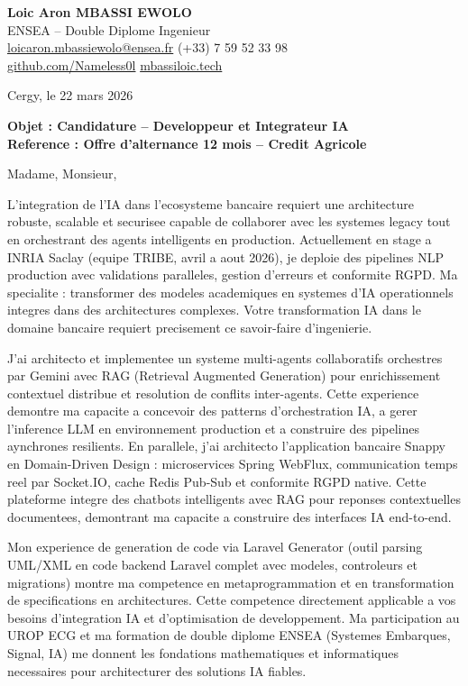 \documentclass[a4paper,11pt]{article}
\begin{document}
\noindent
\textbf{Loic Aron MBASSI EWOLO} \\
ENSEA -- Double Diplome Ingenieur \\
\href{mailto:loicaron.mbassiewolo@ensea.fr}{loicaron.mbassiewolo@ensea.fr} \quad (+33) 7 59 52 33 98 \\
\href{https://github.com/Nameless0l}{github.com/Nameless0l} \quad \href{https://mbassiloic.tech}{mbassiloic.tech}

\vspace{1em}
\noindent
Cergy, le 22 mars 2026

\vspace{1em}
\noindent
\textbf{Objet : Candidature -- Developpeur et Integrateur IA} \\
\textbf{Reference : Offre d'alternance 12 mois -- Credit Agricole}

\vspace{1.5em}
\noindent Madame, Monsieur,

L'integration de l'IA dans l'ecosysteme bancaire requiert une architecture robuste, scalable et securisee capable de collaborer avec les systemes legacy tout en orchestrant des agents intelligents en production. Actuellement en stage a INRIA Saclay (equipe TRIBE, avril a aout 2026), je deploie des pipelines NLP production avec validations paralleles, gestion d'erreurs et conformite RGPD. Ma specialite : transformer des modeles academiques en systemes d'IA operationnels integres dans des architectures complexes. Votre transformation IA dans le domaine bancaire requiert precisement ce savoir-faire d'ingenierie.

J'ai architecto et implementee un systeme multi-agents collaboratifs orchestres par Gemini avec RAG (Retrieval Augmented Generation) pour enrichissement contextuel distribue et resolution de conflits inter-agents. Cette experience demontre ma capacite a concevoir des patterns d'orchestration IA, a gerer l'inference LLM en environnement production et a construire des pipelines aynchrones resilients. En parallele, j'ai architecto l'application bancaire Snappy en Domain-Driven Design : microservices Spring WebFlux, communication temps reel par Socket.IO, cache Redis Pub-Sub et conformite RGPD native. Cette plateforme integre des chatbots intelligents avec RAG pour reponses contextuelles documentees, demontrant ma capacite a construire des interfaces IA end-to-end.

Mon experience de generation de code via Laravel Generator (outil parsing UML/XML en code backend Laravel complet avec modeles, controleurs et migrations) montre ma competence en metaprogrammation et en transformation de specifications en architectures. Cette competence directement applicable a vos besoins d'integration IA et d'optimisation de developpement. Ma participation au UROP ECG et ma formation de double diplome ENSEA (Systemes Embarques, Signal, IA) me donnent les fondations mathematiques et informatiques necessaires pour architecturer des solutions IA fiables.
\end{document}
